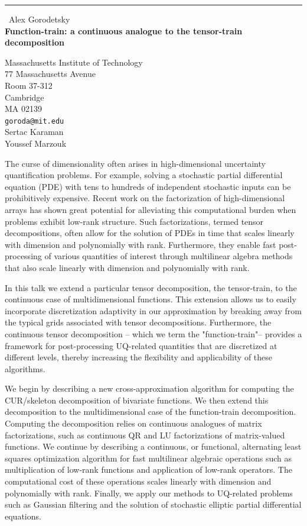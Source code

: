 \documentclass{report}
\begin{document}
\begin{center}
\rule{6in}{1pt} \
{\large Alex Gorodetsky \\
{\bf Function-train: a continuous analogue to the tensor-train decomposition}}

Massachusetts Institute of Technology \\ 77 Massachusetts Avenue \\ Room 37-312 \\ Cambridge \\ MA 02139
\\
{\tt goroda@mit.edu}\\
Sertac Karaman\\
Youssef Marzouk\end{center}

The curse of dimensionality often arises in high-dimensional uncertainty
quantification problems. For example, solving a stochastic partial
differential equation (PDE) with tens to hundreds of independent
stochastic inputs can be prohibitively expensive. Recent work on the
factorization of high-dimensional arrays has shown great potential for
alleviating this computational burden when problems exhibit low-rank
structure. Such factorizations, termed tensor decompositions, often allow
for the solution of PDEs in time that scales linearly with dimension and
polynomially with rank. Furthermore, they enable fast post-processing of
various quantities of interest through multilinear algebra methods that
also scale linearly with dimension and polynomially with rank.

In this talk we extend a particular tensor decomposition, the
tensor-train, to the continuous case of multidimensional functions. This
extension allows us to easily incorporate discretization adaptivity in
our approximation by breaking away from the typical grids associated with
tensor decompositions. Furthermore, the continuous tensor decomposition
-- which we term the "function-train"-- provides a framework for
post-processing UQ-related quantities that are discretized at different
levels, thereby increasing the flexibility and applicability of these
algorithms.

We begin by describing a new cross-approximation algorithm for computing
the CUR/skeleton decomposition of bivariate functions. We then extend
this decomposition to the multidimensional case of the function-train
decomposition. Computing the decomposition relies on continuous analogues
of matrix factorizations, such as continuous QR and LU factorizations of
matrix-valued functions. We continue by describing a continuous, or
functional, alternating least squares optimization algorithm for fast
multilinear algebraic operations such as multiplication of low-rank
functions and application of low-rank operators. The computational cost
of these operations scales linearly with dimension and polynomially with
rank. Finally, we apply our methods to UQ-related problems such as
Gaussian filtering and the solution of stochastic elliptic partial
differential equations.
\end{document}
